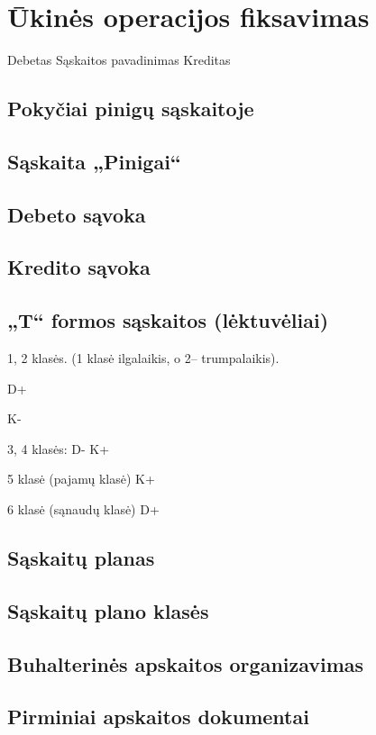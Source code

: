 \chapter{Ūkinės operacijos fiksavimas}

Debetas Sąskaitos pavadinimas Kreditas

\section{Pokyčiai pinigų sąskaitoje}

\section{Sąskaita „Pinigai“}

\section{Debeto sąvoka}

\section{Kredito sąvoka}

\section{„T“ formos sąskaitos (lėktuvėliai)}

1, 2 klasės. (1 klasė ilgalaikis, o 2– trumpalaikis).

D+

K-

3, 4 klasės:
D- K+

5 klasė (pajamų klasė)
K+

6 klasė (sąnaudų klasė)
D+

\section{Sąskaitų planas}

\section{Sąskaitų plano klasės}

\section{Buhalterinės apskaitos organizavimas}

\section{Pirminiai apskaitos dokumentai}

